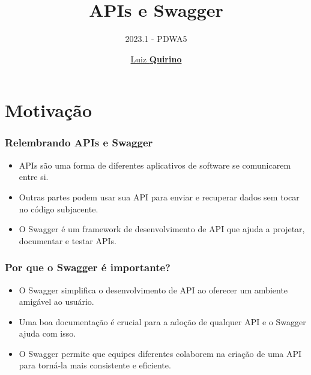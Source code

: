 \documentclass{beamer}
\title{APIs e Swagger}
\subtitle{2023.1 - PDWA5}
\author{\href{mailto:luizfpq@gmail.com}{Luiz \textbf{Quirino}}}
\newcommand{\hrefcol}[2]{\textcolor{cyan}{\href{#1}{#2}}}
\begin{document}
\maketitle

%
%




\section{Motivação}

\begin{frame}
\frametitle{Relembrando APIs e Swagger}

\begin{itemize}
\item APIs são uma forma de diferentes aplicativos de software se comunicarem entre si.
\item Outras partes podem usar sua API para enviar e recuperar dados sem tocar no código subjacente.
\item O Swagger é um framework de desenvolvimento de API que ajuda a projetar, documentar e testar APIs.
\end{itemize}

\end{frame}
\begin{frame}
\frametitle{Por que o Swagger é importante?}

\begin{itemize}
\item O Swagger simplifica o desenvolvimento de API ao oferecer um ambiente amigável ao usuário.
\item Uma boa documentação é crucial para a adoção de qualquer API e o Swagger ajuda com isso.
\item O Swagger permite que equipes diferentes colaborem na criação de uma API para torná-la mais consistente e eficiente.
\end{itemize}

\end{frame}
\end{document}
